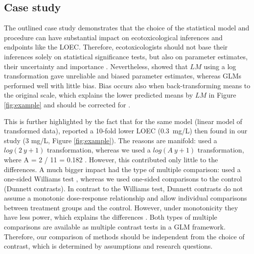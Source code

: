 \documentclass[twocolumn, natbib]{svjour3}
\begin{document}
\subsection{Case study}
The outlined case study demonstrates that the choice of the statistical model and procedure can have substantial impact on ecotoxicological inferences and endpoints like the LOEC.
Therefore, ecotoxicologists should not base their inferences solely on statistical significance tests, but also on parameter estimates, their uncertainty and importance \citep{gelman_difference_2006}.
Nevertheless, \citet{ohara_not_2010} showed that $LM$ using a log transformation gave unreliable and biased parameter estimates, whereas GLMs performed well with little bias.
Bias occurs also when back-transforming means to the original scale, which explains the lower predicted means by $LM$ in Figure \ref{fig:example} \citep{rothery_cautionary_1988} and should be corrected for \citep{newman_regression_1993}.

This is further highlighted by the fact that for the same model (linear model of transformed data), \citet{brock_minimum_2015} reported a 10-fold lower LOEC (\mbox{0.3 mg/L}) then found in our study (3 mg/L, Figure \ref{fig:example}).
The reasons are manifold: \citep{brock_minimum_2015} used a $log(2~y + 1)$ transformation, whereas we used a $log(A~y + 1)$ transformation, where A = 2 / 11 = 0.182 \citep{van_den_brink_impact_2000}.
However, this contributed only little to the differences.
A much bigger impact had the type of multiple comparison: \citet{brock_minimum_2015} used a one-sided Williams test \citep{williams_comparison_1972}, whereas we used one-sided comparisons to the control (Dunnett contrasts).
In contrast to the Williams test, Dunnett contrasts do not assume a monotonic dose-response relationship and allow individual comparisons between treatment groups and the control.
However, under monotonicity they have less power, which explains the differences \citep{jaki_statistical_2013}.
Both types of multiple comparisons are available as multiple contrast tests in a GLM framework.
Therefore, our comparison of methods should be independent from the choice of contrast, which is determined by assumptions and research questions. 
\end{document}
